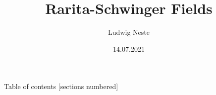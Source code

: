 

\title{Rarita-Schwinger Fields}
\date{14.07.2021}
\author{Ludwig Neste}



\begin{frame}
	\titlepage
\end{frame}
\begin{frame}{Table of contents}
	[sections numbered]
	\tableofcontents[hideallsubsections]
\end{frame}



